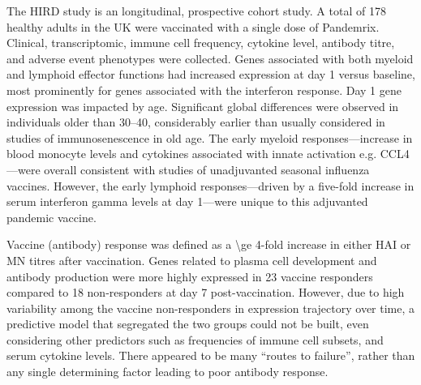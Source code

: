 The \gls{HIRD} study is an longitudinal, prospective cohort study.
A total of 178 healthy adults in the UK were vaccinated with a single dose of Pandemrix.
Clinical, transcriptomic, immune cell frequency, cytokine level, antibody titre, and adverse event phenotypes were collected.
Genes associated with both myeloid and lymphoid effector functions had increased expression at day 1 versus baseline, 
most prominently for genes associated with the interferon response.
Day 1 gene expression was impacted by age.
Significant global differences were observed in individuals older than \SIrange{30}{40}{\year}, 
considerably earlier than usually considered in studies of immunosenescence in old age.
The early myeloid responses---increase in blood monocyte levels and cytokines associated with innate activation e.g. CCL4---were overall consistent with studies of unadjuvanted seasonal influenza vaccines.
However, the early lymphoid responses---driven by a five-fold increase in serum interferon gamma levels at day 1---were unique to this adjuvanted pandemic vaccine.

Vaccine (antibody) response was defined as a \num{\ge 4}-fold increase in either \gls{HAI} or \gls{MN} titres after vaccination.
Genes related to plasma cell development and antibody production were more highly expressed in 23 vaccine responders compared to 18 non-responders at day 7 post-vaccination.
However, due to high variability among the vaccine non-responders in expression trajectory over time, 
a predictive model that segregated the two groups could not be built,
even considering other predictors such as frequencies of immune cell subsets, and serum cytokine levels.
There appeared to be many \enquote{routes to failure}, rather than any single determining factor leading to poor antibody response.

